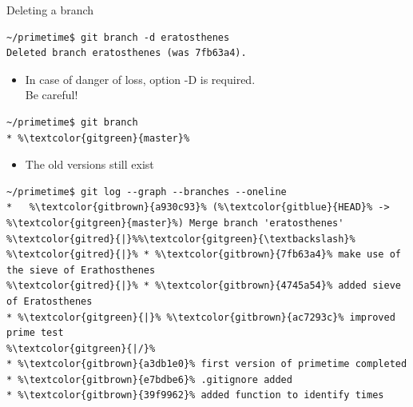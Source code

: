 \documentclass[svgnames]{beamer}
\begin{document}
\begin{frame}[fragile]{Deleting a branch}
 \begin{lstlisting}
~/primetime$ git branch -d eratosthenes
Deleted branch eratosthenes (was 7fb63a4).
 \end{lstlisting}
 \begin{itemize}
  \item In case of danger of loss, option -D is required.\\\textcolor{gitred}{Be careful!}
 \end{itemize}
 \begin{lstlisting}[escapechar=\%]
~/primetime$ git branch
* %\textcolor{gitgreen}{master}%
 \end{lstlisting}
 \begin{itemize}
  \item The old versions still exist
 \end{itemize}
 \begin{lstlisting}[escapechar=\%]
~/primetime$ git log --graph --branches --oneline
*   %\textcolor{gitbrown}{a930c93}% (%\textcolor{gitblue}{HEAD}% -> %\textcolor{gitgreen}{master}%) Merge branch 'eratosthenes'
%\textcolor{gitred}{|}%%\textcolor{gitgreen}{\textbackslash}%
%\textcolor{gitred}{|}% * %\textcolor{gitbrown}{7fb63a4}% make use of the sieve of Erathosthenes
%\textcolor{gitred}{|}% * %\textcolor{gitbrown}{4745a54}% added sieve of Eratosthenes
* %\textcolor{gitgreen}{|}% %\textcolor{gitbrown}{ac7293c}% improved prime test
%\textcolor{gitgreen}{|/}%
* %\textcolor{gitbrown}{a3db1e0}% first version of primetime completed
* %\textcolor{gitbrown}{e7bdbe6}% .gitignore added
* %\textcolor{gitbrown}{39f9962}% added function to identify times
 \end{lstlisting}
\end{frame}
\end{document}
